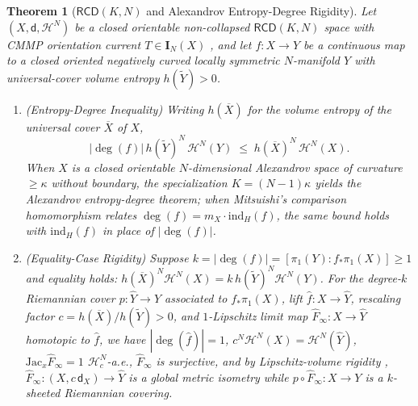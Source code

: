 \documentclass[10pt]{article}
\renewcommand{\_}{\origus\allowbreak}
\newtheorem{theorem}{Theorem}
\begin{document}
\begin{theorem}[$\mathsf{RCD}(K, N)$ and Alexandrov Entropy-Degree Rigidity]\label{thm:rcd_main}
Let $(X, \mathsf{d}, \mathcal{H}^N)$ be a closed orientable non-collapsed $\mathsf{RCD}(K, N)$ space with
CMMP orientation current $T \in \mathbf{I}_N(X)$ \cite{CMMP}, and let $f : X \to Y$ be a continuous map to
a closed oriented negatively curved locally symmetric $N$-manifold $Y$ with universal-cover volume
entropy $h(\widetilde{Y}) > 0$.
\begin{enumerate}[label=\textbf{(\arabic*)}]
\item \emph{(Entropy-Degree Inequality)} Writing $h(\overline{X})$ for the volume entropy of the
universal cover $\overline{X}$ of $X$,
\[
|\deg(f)|\, h(\widetilde{Y})^N \, \mathcal{H}^N(Y) \;\le\; h(\overline{X})^N \, \mathcal{H}^N(X).
\]
When $X$ is a closed orientable $N$-dimensional Alexandrov space of curvature $\ge \kappa$ without
boundary, the specialization $K = (N - 1)\kappa$ yields the Alexandrov entropy-degree theorem; when
Mitsuishi's comparison homomorphism relates $\deg(f) = m_X \cdot \mathrm{ind}_H(f)$, the same bound
holds with $\mathrm{ind}_H(f)$ in place of $|\deg(f)|$.
\item \emph{(Equality-Case Rigidity)} Suppose $k = |\deg(f)| = [\pi_1(Y) : f_*\pi_1(X)] \ge 1$ and
equality holds: $h(\overline{X})^N \mathcal{H}^N(X) = k\, h(\widetilde{Y})^N \mathcal{H}^N(Y)$.
For the degree-$k$ Riemannian cover $p : \widehat{Y} \to Y$ associated to $f_*\pi_1(X)$, lift
$\hat{f} : X \to \widehat{Y}$, rescaling factor $c = h(\overline{X}) / h(\widetilde{Y}) > 0$, and
$1$-Lipschitz limit map $\hat{F}_\infty : X \to \widehat{Y}$ homotopic to $\hat{f}$, we have
$|\deg(\hat{f})| = 1$, $c^N \mathcal{H}^N(X) = \mathcal{H}^N(\widehat{Y})$,
$\mathrm{Jac}_x \hat{F}_\infty = 1$ $\mathcal{H}^N_c$-a.e., $\hat{F}_\infty$ is surjective, and
by Lipschitz-volume rigidity \cite{LiWang}, $\hat{F}_\infty : (X, c\,\mathsf{d}_X) \to \widehat{Y}$ is a
global metric isometry while $p \circ \hat{F}_\infty : X \to Y$ is a $k$-sheeted Riemannian covering.
\end{enumerate}
\end{theorem}
\end{document}
